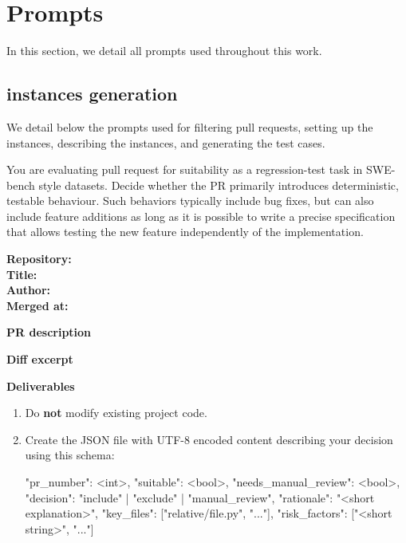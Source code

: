 \section{Prompts}
\label{app:prompt}

In this section, we detail all prompts used throughout this work.
\vspace{-0.1in}

\subsection{\planbench{} instances generation}

We detail below the prompts used for filtering pull requests, setting up the instances, describing the instances, and generating the test cases.

\begin{promptbox}
You are evaluating pull request  for suitability as a regression-test
task in SWE-bench style datasets. Decide whether the PR primarily introduces deterministic, testable behaviour.
Such behaviors typically include bug fixes, but can also include feature additions as long as it is possible to write a precise specification that allows testing the new feature independently of the implementation.

\medskip
\textbf{Repository:} \\
\textbf{Title:} \\
\textbf{Author:} \\
\textbf{Merged at:} 

\medskip
\textbf{PR description}\\

\medskip
\textbf{Diff excerpt}\\

\medskip
\textbf{Deliverables}
\begin{enumerate}[leftmargin=1.6em, itemsep=0.25em]
  \item Do \textbf{not} modify existing project code.
  \item Create the JSON file  with UTF-8 encoded content describing your
  decision using this schema:

  \begin{schemabox}
{
  "pr_number": <int>,
  "suitable": <bool>,
  "needs_manual_review": <bool>,
  "decision": "include" | "exclude" | "manual_review",
  "rationale": "<short explanation>",
  "key_files": ["relative/file.py", "..."],
  "risk_factors": ["<short string>", "..."]
}
  \end{schemabox}


\end{enumerate}
\end{promptbox}
